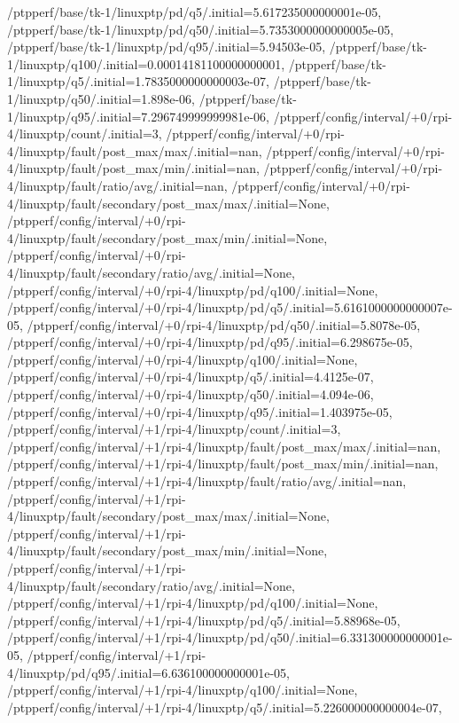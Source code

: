 {    /ptpperf/base/tk-1/linuxptp/pd/q5/.initial=5.617235000000001e-05,
    /ptpperf/base/tk-1/linuxptp/pd/q50/.initial=5.7353000000000005e-05,
    /ptpperf/base/tk-1/linuxptp/pd/q95/.initial=5.94503e-05,
    /ptpperf/base/tk-1/linuxptp/q100/.initial=0.00014181100000000001,
    /ptpperf/base/tk-1/linuxptp/q5/.initial=1.7835000000000003e-07,
    /ptpperf/base/tk-1/linuxptp/q50/.initial=1.898e-06,
    /ptpperf/base/tk-1/linuxptp/q95/.initial=7.296749999999981e-06,
    /ptpperf/config/interval/+0/rpi-4/linuxptp/count/.initial=3,
    /ptpperf/config/interval/+0/rpi-4/linuxptp/fault/post_max/max/.initial=nan,
    /ptpperf/config/interval/+0/rpi-4/linuxptp/fault/post_max/min/.initial=nan,
    /ptpperf/config/interval/+0/rpi-4/linuxptp/fault/ratio/avg/.initial=nan,
    /ptpperf/config/interval/+0/rpi-4/linuxptp/fault/secondary/post_max/max/.initial=None,
    /ptpperf/config/interval/+0/rpi-4/linuxptp/fault/secondary/post_max/min/.initial=None,
    /ptpperf/config/interval/+0/rpi-4/linuxptp/fault/secondary/ratio/avg/.initial=None,
    /ptpperf/config/interval/+0/rpi-4/linuxptp/pd/q100/.initial=None,
    /ptpperf/config/interval/+0/rpi-4/linuxptp/pd/q5/.initial=5.6161000000000007e-05,
    /ptpperf/config/interval/+0/rpi-4/linuxptp/pd/q50/.initial=5.8078e-05,
    /ptpperf/config/interval/+0/rpi-4/linuxptp/pd/q95/.initial=6.298675e-05,
    /ptpperf/config/interval/+0/rpi-4/linuxptp/q100/.initial=None,
    /ptpperf/config/interval/+0/rpi-4/linuxptp/q5/.initial=4.4125e-07,
    /ptpperf/config/interval/+0/rpi-4/linuxptp/q50/.initial=4.094e-06,
    /ptpperf/config/interval/+0/rpi-4/linuxptp/q95/.initial=1.403975e-05,
    /ptpperf/config/interval/+1/rpi-4/linuxptp/count/.initial=3,
    /ptpperf/config/interval/+1/rpi-4/linuxptp/fault/post_max/max/.initial=nan,
    /ptpperf/config/interval/+1/rpi-4/linuxptp/fault/post_max/min/.initial=nan,
    /ptpperf/config/interval/+1/rpi-4/linuxptp/fault/ratio/avg/.initial=nan,
    /ptpperf/config/interval/+1/rpi-4/linuxptp/fault/secondary/post_max/max/.initial=None,
    /ptpperf/config/interval/+1/rpi-4/linuxptp/fault/secondary/post_max/min/.initial=None,
    /ptpperf/config/interval/+1/rpi-4/linuxptp/fault/secondary/ratio/avg/.initial=None,
    /ptpperf/config/interval/+1/rpi-4/linuxptp/pd/q100/.initial=None,
    /ptpperf/config/interval/+1/rpi-4/linuxptp/pd/q5/.initial=5.88968e-05,
    /ptpperf/config/interval/+1/rpi-4/linuxptp/pd/q50/.initial=6.331300000000001e-05,
    /ptpperf/config/interval/+1/rpi-4/linuxptp/pd/q95/.initial=6.636100000000001e-05,
    /ptpperf/config/interval/+1/rpi-4/linuxptp/q100/.initial=None,
    /ptpperf/config/interval/+1/rpi-4/linuxptp/q5/.initial=5.226000000000004e-07,
}

